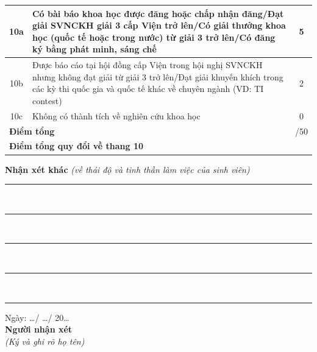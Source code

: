 \begin{center}
\begin{tabularx}{\textwidth}{|c|X|c|c|c|c|c|}
10a & Có bài báo khoa học được đăng hoặc chấp nhận đăng/Đạt giải SVNCKH giải 3 cấp Viện trở lên/Có giải thưởng khoa học (quốc tế hoặc trong nước) từ giải 3 trở lên/Có đăng ký bằng phát minh, sáng chế & \multicolumn{5}{c|}{5} \\ \hline
10b & Được báo cáo tại hội đồng cấp Viện trong hội nghị SVNCKH nhưng không đạt giải từ giải 3 trở lên/Đạt giải khuyến khích trong các kỳ thi quốc gia và quốc tế khác về chuyên ngành (VD: TI contest) & \multicolumn{5}{c|}{2} \\ \hline
10c & Không có thành tích về nghiên cứu khoa học & \multicolumn{5}{c|}{0} \\ \hline
\multicolumn{2}{|l|}{\textbf{Điểm tổng}} & \multicolumn{5}{r|}{/50} \\ \hline
\multicolumn{2}{|l|}{\textbf{Điểm tổng quy đổi về thang 10}} & \multicolumn{5}{r|}{} \\ \hline
\end{tabularx}
\end{center}

\newpage
\thispagestyle{empty}

\vspace*{10pt}
\noindent \textbf{Nhận xét khác} \textit{(về thái độ và tinh thần làm việc của sinh viên)}\\
\noindent\rule{\textwidth}{0.1mm}\\
\noindent\rule{\textwidth}{0.1mm}\\
\noindent\rule{\textwidth}{0.1mm}\\
\noindent\rule{\textwidth}{0.1mm}\\
\noindent\rule{\textwidth}{0.1mm}

\vspace{25pt}
\hfill \parbox{5cm}{
    \centering
    Ngày: \dots / \dots / 20\dots \\
    \vspace{10pt}
    \textbf{Người nhận xét}\\
    \textit{\fontsize{10pt}{12pt}\selectfont (Ký và ghi rõ họ tên)}
}
\newpage
